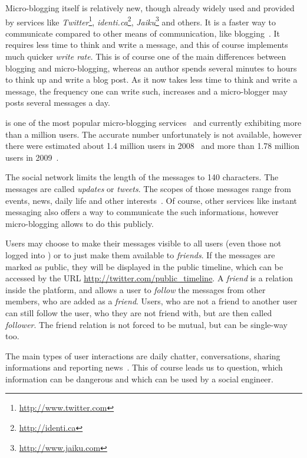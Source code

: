 Micro-blogging itself is relatively new, though already widely used and
provided by services like
\textit{Twitter}\footnote{\url{http://www.twitter.com}},
\textit{identi.ca}\footnote{\url{http://identi.ca}},
\textit{Jaiku}\footnote{\url{http://www.jaiku.com}} and others. It is a faster
way to communicate compared to other means of communication, like
blogging~\cite{java2007}. It requires less time to think and write a message,
and this of course implements much quicker \textit{write rate}. This is of
course one of the main differences between blogging and micro-blogging, whereas
an author spends several minutes to hours to think up and write a blog post. As
it now takes less time to think and write a message, the frequency one can
write such, increases and a micro-blogger may posts several messages a day.

\Twitter{} is one of the most popular micro-blogging services~\cite{java2007}
and currently exhibiting more than a million users. The accurate number
unfortunately is not available, however there were estimated about 1.4 million
users in 2008~\cite{krishnamurthy2008} and more than 1.78 million users in
2009~\cite{whitworth2009}.

The social network limits the length of the messages to 140 characters. The messages
are called \textit{updates} or \textit{tweets}. The scopes of those messages
range from events, news, daily life and other interests~\cite{java2007}. Of
course, other services like instant messaging also offers a way to communicate
the such informations, however micro-blogging allows to do this publicly.

Users may choose to make their messages visible to all users (even those not
logged into \Twitter{}) or to just make them available to \textit{friends}.
If the messages are marked as public, they will be displayed in
the public timeline, which can be accessed by the URL
\url{http://twitter.com/public_timeline}.
A \textit{friend} is a relation inside the \Twitter{} platform, and allows a user
to \textit{follow} the messages from other members, who are added as a
\textit{friend}. Users, who are not a friend to another user can still follow
the user, who they are not friend with, but are then called \textit{follower}.
The friend relation is not forced to be mutual, but can be single-way too.

The main types of user interactions are daily chatter, conversations, sharing
informations and reporting news~\cite{java2007}. This of course leads us to
question, which information can be dangerous and which can be used by a social
engineer.

